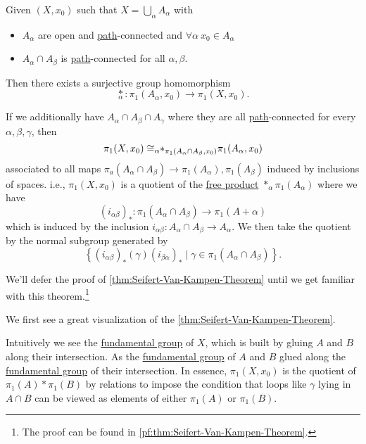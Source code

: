 \begin{theorem}\label{thm:Seifert-Van-Kampen-Theorem}
	Given \((X, x_0)\) such that \(X = \bigcup\limits_{\alpha } A_{\alpha }\) with
	\begin{itemize}
		\item \(A_{\alpha }\) are open and \hyperref[def:path]{path}-connected and \(\forall \alpha \ x_0\in A_{\alpha }\)
		\item \(A_{\alpha }\cap A_{\beta }\) is \hyperref[def:path]{path}-connected for all \(\alpha, \beta  \).
	\end{itemize}
	Then there exists a surjective group homomorphism
	\[
		\underset{\alpha }{\ast}\colon \pi _1(A_{\alpha }, x_0)\to \pi _1(X, x_0).
	\]

	\par If we additionally have \(A_{\alpha }\cap A_{\beta}\cap A_{\gamma}\) where they are all \hyperref[def:path]{path}-connected for every \(\alpha , \beta , \gamma\), then
	\[
		\pi _1(X, x_0)\cong _{\alpha }\hspace{-0.3em}\ast_{\pi _1(A_{\alpha }\cap A_{\beta }, x_0)}{}\pi _1(A_{\alpha }, x_0)
	\]
	associated to all maps \(\pi _a(A_{\alpha }\cap A_{\beta }) \to \pi _1 (A_{\alpha }), \pi _1(A_{\beta })\) induced by inclusions of spaces. i.e., \(\pi _1(X, x_0)\)
	is a quotient of the \hyperref[def:free-product-with-amalgamation]{free product} \(\ast_{\alpha}\pi _1(A_{\alpha })\) where we have
	\[
		(i_{\alpha \beta })_\ast\colon \pi _1(A_{\alpha }\cap A_{\beta })\to \pi _1(A+\alpha )
	\]
	which is induced by the inclusion \(i_{\alpha \beta }\colon A_{\alpha}\cap A_{\beta }\to A_{\alpha }\). We then take the quotient by the normal subgroup generated by
	\[
		\left\{(i_{\alpha \beta })_{\ast}(\gamma)(i_{\beta \alpha })_{\ast} \mid \gamma\in \pi _1(A_{\alpha }\cap A_{\beta })\right\}.
	\]
\end{theorem}
We'll defer the proof of \autoref{thm:Seifert-Van-Kampen-Theorem} until we get familiar with this theorem.\footnote{The proof can be found in \autoref{pf:thm:Seifert-Van-Kampen-Theorem}.}
\begin{eg}
	We first see a great visualization of the \autoref{thm:Seifert-Van-Kampen-Theorem}.
	\begin{figure}[H]
		\centering
		\label{fig:eg:Seifert-Van-Kampen-Theorem}
	\end{figure}
	Intuitively we see the \hyperref[def:fundamental-group]{fundamental group} of \(X\), which is built by gluing \(A\) and \(B\) along their intersection.
	As the \hyperref[def:fundamental-group]{fundamental group} of \(A\) and \(B\) glued along the \hyperref[def:fundamental-group]{fundamental group} of their
	intersection. In essence, \(\pi _1 (X, x_0)\) is the quotient of \(\pi _1(A)\ast \pi _1(B)\) by relations to impose the condition that loops like \(\gamma \)
	lying in \(A\cap B\) can be viewed as elements of either \(\pi _1(A)\) or \(\pi _1(B)\).
\end{eg}
